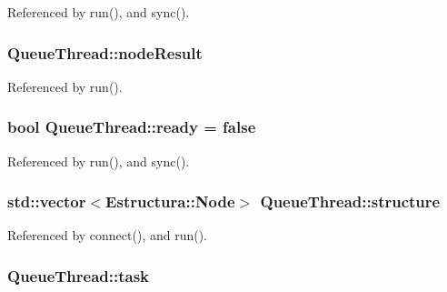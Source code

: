 Referenced by run(), and sync().

\subsubsection[{\texorpdfstring{node\+Result}{nodeResult}}]{ Queue\+Thread\+::node\+Result}\hypertarget{classQueueThread_aa775f99b02ff36d5336212ae53bd12b4}{}\label{classQueueThread_aa775f99b02ff36d5336212ae53bd12b4}


Referenced by run().

\subsubsection[{\texorpdfstring{ready}{ready}}]{\setlength{\rightskip}{0pt plus 5cm}bool Queue\+Thread\+::ready = false}\hypertarget{classQueueThread_a26f11295bff95a8a44bb75a58168d611}{}\label{classQueueThread_a26f11295bff95a8a44bb75a58168d611}


Referenced by run(), and sync().

\subsubsection[{\texorpdfstring{structure}{structure}}]{\setlength{\rightskip}{0pt plus 5cm}std\+::vector$<${\bf Estructura\+::\+Node}$>$ Queue\+Thread\+::structure}\hypertarget{classQueueThread_ab591bae3315c80df7fa723db66e763fa}{}\label{classQueueThread_ab591bae3315c80df7fa723db66e763fa}


Referenced by connect(), and run().

\subsubsection[{\texorpdfstring{task}{task}}]{ Queue\+Thread\+::task}\hypertarget{classQueueThread_a4cf069642e3f67ff759a2163fa2ef3ce}{}\label{classQueueThread_a4cf069642e3f67ff759a2163fa2ef3ce}


